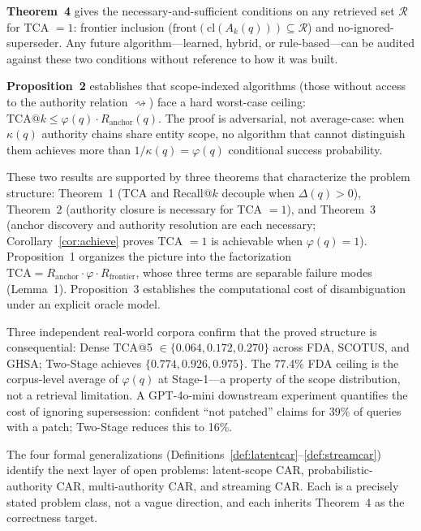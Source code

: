 \documentclass[11pt]{article}
\begin{document}
\textbf{Theorem~4} gives the necessary-and-sufficient conditions on any retrieved set $\mathcal{R}$ for TCA $= 1$: frontier inclusion ($\mathrm{front}(\mathrm{cl}(A_k(q))) \subseteq \mathcal{R}$) and no-ignored-superseder. Any future algorithm---learned, hybrid, or rule-based---can be audited against these two conditions without reference to how it was built.

\textbf{Proposition~2} establishes that scope-indexed algorithms (those without access to the authority relation $\rightsquigarrow$) face a hard worst-case ceiling: $\mathrm{TCA}@k \leq \varphi(q) \cdot R_{\mathrm{anchor}}(q)$. The proof is adversarial, not average-case: when $\kappa(q)$ authority chains share entity scope, no algorithm that cannot distinguish them achieves more than $1/\kappa(q) = \varphi(q)$ conditional success probability.

These two results are supported by three theorems that characterize the problem structure: Theorem~1 (TCA and Recall@$k$ decouple when $\Delta(q) > 0$), Theorem~2 (authority closure is necessary for TCA $= 1$), and Theorem~3 (anchor discovery and authority resolution are each necessary; Corollary~\ref{cor:achieve} proves TCA $= 1$ is achievable when $\varphi(q) = 1$). Proposition~1 organizes the picture into the factorization $\mathrm{TCA} = R_{\mathrm{anchor}} \cdot \varphi \cdot R_{\mathrm{frontier}}$, whose three terms are separable failure modes (Lemma~1). Proposition~3 establishes the computational cost of disambiguation under an explicit oracle model.

Three independent real-world corpora confirm that the proved structure is consequential: Dense TCA@5 $\in \{0.064, 0.172, 0.270\}$ across FDA, SCOTUS, and GHSA; Two-Stage achieves $\{0.774, 0.926, 0.975\}$. The 77.4\% FDA ceiling is the corpus-level average of $\varphi(q)$ at Stage-1---a property of the scope distribution, not a retrieval limitation. A GPT-4o-mini downstream experiment quantifies the cost of ignoring supersession: confident ``not patched'' claims for 39\% of queries with a patch; Two-Stage reduces this to 16\%.

The four formal generalizations (Definitions~\ref{def:latentcar}--\ref{def:streamcar}) identify the next layer of open problems: latent-scope CAR, probabilistic-authority CAR, multi-authority CAR, and streaming CAR. Each is a precisely stated problem class, not a vague direction, and each inherits Theorem~4 as the correctness target.



\end{document}
